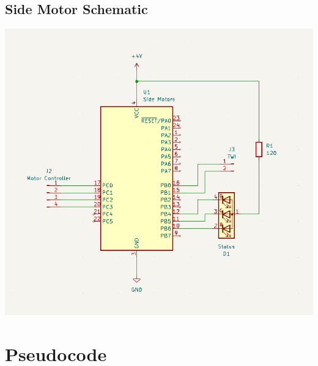 \documentclass[11pt,a4paper,titlepage]{report}
\begin{document}
	\subsection{Side Motor Schematic}\label{appendix:side_motor_schematic}
	\begin{center}
		\label{picture:side_motor_schematic}
		\includegraphics[width=\linewidth]{assets/SideMotorSchematic.png}
	\end{center}
	
	\section{Pseudocode}\label{appendix:pseudocode}
\end{document}
